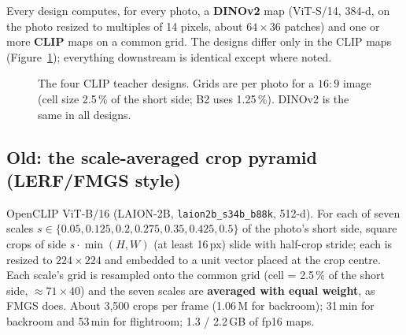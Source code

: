 \documentclass[11pt,a4paper]{article}
\newcommand{\code}[1]{\texttt{#1}}
\begin{document}
Every design computes, for every photo, a \textbf{DINOv2} map (ViT-S/14, 384-d, on the photo resized to multiples of
14 pixels, about $64\times36$ patches) and one or more \textbf{CLIP} maps on a common grid. The designs differ only in
the CLIP maps (Figure~\ref{fig:teachers}); everything downstream is identical except where noted.

\begin{figure}[ht]
\centering
{}
\caption{The four CLIP teacher designs. Grids are per photo for a $16{:}9$ image (cell size 2.5\,\% of the short side;
B2 uses 1.25\,\%). DINOv2 is the same in all designs.}
\label{fig:teachers}
\end{figure}

\subsection{Old: the scale-averaged crop pyramid (LERF/FMGS style)}
OpenCLIP ViT-B/16 (LAION-2B, \code{laion2b\_s34b\_b88k}, 512-d). For each of seven scales
$s\in\{0.05, 0.125, 0.2, 0.275, 0.35, 0.425, 0.5\}$ of the photo's short side, square crops of side
$s\cdot\min(H,W)$ (at least 16\,px) slide with half-crop stride; each is resized to $224\times224$ and embedded to a unit
vector placed at the crop centre. Each scale's grid is resampled onto the common grid (cell = 2.5\,\% of the short
side, $\approx71\times40$) and the seven scales are \textbf{averaged with equal weight}, as FMGS does. About 3{,}500 crops
per frame (1.06\,M for backroom); 31\,min for backroom and 53\,min for flightroom; 1.3 / 2.2\,GB of fp16 maps.
\end{document}
